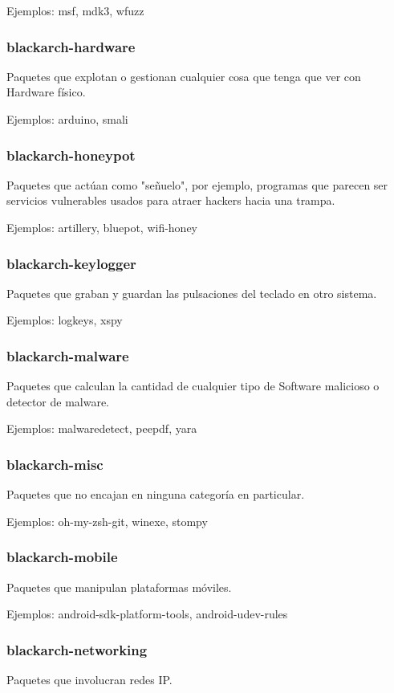 \documentclass[a4paper, oneside, 11pt]{book}
\begin{document}
Ejemplos: msf, mdk3, wfuzz

\subsubsection{blackarch-hardware}
Paquetes que explotan o gestionan cualquier cosa que tenga que ver
con Hardware físico.

Ejemplos: arduino, smali

\subsubsection{blackarch-honeypot}
Paquetes que actúan como "señuelo", por ejemplo, programas que parecen ser
servicios vulnerables usados para atraer hackers hacia una trampa.

Ejemplos: artillery, bluepot, wifi-honey

\subsubsection{blackarch-keylogger}
Paquetes que graban y guardan las pulsaciones del teclado en otro sistema.

Ejemplos: logkeys, xspy

\subsubsection{blackarch-malware}
Paquetes que calculan la cantidad de cualquier tipo de Software malicioso o 
detector de malware.

Ejemplos: malwaredetect, peepdf, yara

\subsubsection{blackarch-misc}
Paquetes que no encajan en ninguna categoría en particular.

Ejemplos: oh-my-zsh-git, winexe, stompy

\subsubsection{blackarch-mobile}
Paquetes que manipulan plataformas móviles.

Ejemplos: android-sdk-platform-tools, android-udev-rules

\subsubsection{blackarch-networking}
Paquetes que involucran redes IP.
\end{document}
